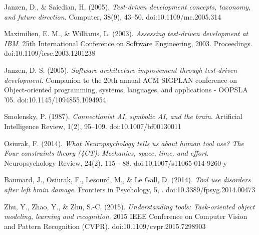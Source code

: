 \documentclass[11]{article}
\begin{document}
\begin{thebibliography}{9}

Janzen, D., \& Saiedian, H. (2005). \emph{Test-driven development concepts, taxonomy, and future direction}. Computer, 38(9), 43–50. doi:10.1109/mc.2005.314

Maximilien, E. M., \& Williams, L. (2003). \emph{Assessing test-driven development at IBM}. 25th International Conference on Software Engineering, 2003. Proceedings. doi:10.1109/icse.2003.1201238

Janzen, D. S. (2005). \emph{Software architecture improvement through test-driven development}. Companion to the 20th annual ACM SIGPLAN conference on Object-oriented programming, systems, languages, and applications - OOPSLA ’05. doi:10.1145/1094855.1094954

Smolensky, P. (1987). \emph{Connectionist AI, symbolic AI, and the brain}. Artificial Intelligence Review, 1(2), 95–109. doi:10.1007/bf00130011

Osiurak, F. (2014). \emph{What Neuropsychology tells us about human tool use? The Four constraints theory (4CT): Mechanics, space, time, and effort}. Neuropsychology Review, 24(2), 115 - 88. doi:10.1007/s11065-014-9260-y

Baumard, J., Osiurak, F., Lesourd, M., \& Le Gall, D. (2014). \emph{Tool use disorders after left brain damage}. Frontiers in Psychology, 5, . doi:10.3389/fpsyg.2014.00473


Zhu, Y., Zhao, Y., \& Zhu, S.-C. (2015). \emph{Understanding tools: Task-oriented object modeling, learning and recognition}. 2015 IEEE Conference on Computer Vision and Pattern Recognition (CVPR). doi:10.1109/cvpr.2015.7298903



\end{thebibliography}
\end{document}
